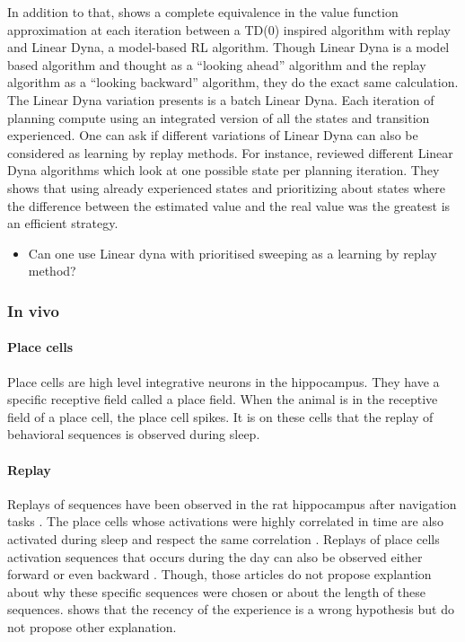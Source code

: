 \documentclass[]{article}
\begin{document}
In addition to that, \textcite{vanseijen_deeper_2015} shows a complete equivalence in the value function approximation at each iteration between a TD(0) inspired algorithm with replay and Linear Dyna, a model-based RL algorithm. Though Linear Dyna is a model based algorithm and thought as a ``looking ahead'' algorithm and the replay algorithm as a ``looking backward'' algorithm, they do the exact same calculation.
The Linear Dyna variation \textcite{vanseijen_deeper_2015} presents is a batch Linear Dyna. Each iteration of planning compute using an integrated version of all the states and transition experienced. One can ask if different variations of Linear Dyna can also be considered as learning by replay methods. For instance, \textcite{sutton_dyna-style_2012} reviewed different Linear Dyna algorithms which look at one possible state per planning iteration. They shows that using already experienced states and prioritizing about states where the difference between the estimated value and the real value was the greatest is an efficient strategy.


\begin{itemize}
\item
  Can one use Linear dyna with prioritised sweeping as a learning by replay method?
\end{itemize}

\subsubsection{In vivo}
\label{sub:In vivo}

\paragraph{Place cells}\label{place-cells}
Place cells are high level integrative neurons in the hippocampus. They have a specific receptive field called a place field. When the animal is in the receptive field of a place cell, the place cell spikes. It is on these cells that the replay of behavioral sequences is observed during sleep.

\paragraph{Replay}
Replays of sequences have been observed in the rat hippocampus after navigation tasks \parencite{wilson_reactivation_1994, skaggs_replay_1996, davidson_hippocampal_2009, gupta_hippocampal_2010}. The place cells whose activations were highly correlated in time are also activated during sleep and respect the same correlation \parencite{wilson_reactivation_1994}. Replays of place cells activation sequences that occurs during the day can also be observed either forward \parencite{skaggs_replay_1996} or even backward \parencite{gupta_hippocampal_2010}. Though, those articles do not propose explantion about why these specific sequences were chosen or about the length of these sequences. \textcite{gupta_hippocampal_2010} shows that the recency of the experience is a wrong hypothesis but do not propose other explanation. 
\end{document}
